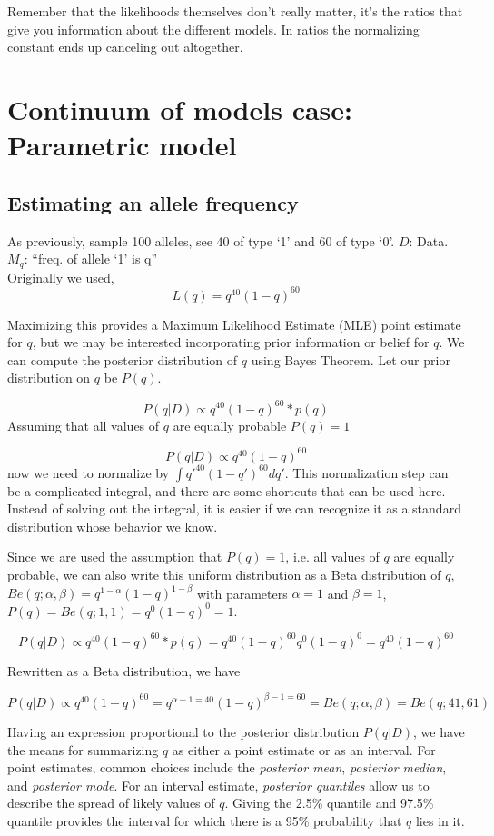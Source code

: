 \documentclass[12pt]{report}
\begin{document}
Remember that the likelihoods themselves don't really matter, it's the ratios that give you information about the different models. In ratios the normalizing constant ends up canceling out altogether.

\section{Continuum of models case: Parametric model}
\subsection{Estimating an allele frequency}

As previously, sample 100 alleles, see 40 of type `1' and 60 of type `0'. $D$: Data. $M_q$: ``freq. of allele `1' is q''\\

Originally we used,
\[
L(q) = q^{40} (1-q)^{60}
\]

Maximizing this provides a Maximum Likelihood Estimate (MLE) point estimate for $q$, but we may be interested incorporating prior information or belief for $q$. We can compute the posterior distribution of $q$ using Bayes Theorem. Let our prior distribution on $q$ be $P(q)$.

\[
P(q|D) \propto q^{40} (1-q)^{60} * p(q)
\]
Assuming that all values of $q$ are equally probable $P(q)=1$

\[
P(q|D) \propto q^{40} (1-q)^{60}
\]
 now we need to normalize by $\int q'^{40}(1-q')^{60} dq'$. This normalization step can be a complicated integral, and there are some shortcuts that can be used here. Instead of solving out the integral, it is easier if we can recognize it as a standard distribution whose behavior we know.

 Since we are used the assumption that $P(q)=1$, i.e. all values of $q$ are equally probable, we can also write this uniform distribution as a Beta distribution of $q$, $Be(q;\alpha,\beta)=q^{1-\alpha} (1-q)^{1-\beta}$ with parameters $\alpha=1$ and $\beta=1$, $P(q) = Be(q;1,1) = q^0 (1-q)^0 = 1$.

\[
P(q|D) \propto q^{40} (1-q)^{60} * p(q) =  q^{40} (1-q)^{60} q^0 (1-q)^0 = q^{40} (1-q)^{60}
\]

Rewritten as a Beta distribution, we have


\[
P(q|D) \propto q^{40} (1-q)^{60} = q^{\alpha -1 = 40} (1-q)^{\beta -1 = 60} = Be(q;\alpha,\beta) = Be(q;41,61)
\]

Having an expression proportional to the posterior distribution $P(q|D)$, we have the means for summarizing $q$ as either a point estimate or as an interval. For point estimates, common choices include the \emph{posterior mean}, \emph{posterior median}, and \emph{posterior mode}. For an interval estimate, \emph{posterior quantiles} allow us to describe the spread of likely values of $q$. Giving the 2.5\% quantile and 97.5\% quantile provides the interval for which there is a 95\% probability that $q$ lies in it.
\end{document}
